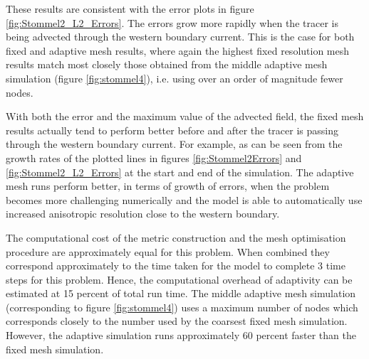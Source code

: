These results are consistent with the error plots in figure \ref{fig:Stommel2_L2_Errors}.
The errors grow more rapidly when the tracer is being advected through the western boundary current.
This is the case for both fixed and adaptive mesh results, where again the highest fixed resolution
mesh results match most closely those obtained from the middle adaptive mesh simulation (figure \ref{fig:stommel4}),
i.e. using over an order of magnitude fewer nodes.

With both the \Ltwo error and the maximum value of the advected field, the fixed mesh results
actually tend to perform better before and after the tracer is passing through the western boundary current.
For example, as can be seen from the growth rates of the plotted lines in figures \ref{fig:Stommel2Errors} and \ref{fig:Stommel2_L2_Errors}
 at the start and end of the simulation. The adaptive mesh runs perform better, in terms of
growth of errors, when the problem becomes more challenging numerically and the model is able to automatically use
increased anisotropic resolution close to the western boundary.


The computational cost of the metric construction and the mesh optimisation procedure are approximately
equal for this problem. When combined they correspond approximately to the time taken for the model
to complete 3 time steps for this problem. Hence, the computational overhead of adaptivity can be estimated
at 15 percent of total run time. The middle adaptive mesh simulation (corresponding to figure \ref{fig:stommel4})
uses a maximum number of nodes which corresponds closely to the number used by the coarsest fixed mesh simulation.
However, the adaptive simulation runs approximately 60 percent faster than the fixed mesh simulation.


